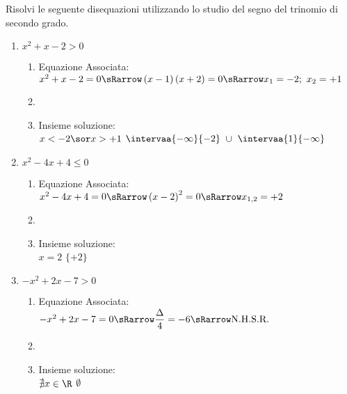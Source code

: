 \begin{esempio}
Risolvi le seguente disequazioni utilizzando lo studio del segno del trinomio 
di secondo grado.

\begin{enumerate}
\item \(x^2+x-2>0\)

\begin{enumerate}
 \item
  Equazione Associata:~~\(x^2+x-2=0 \sRarrow 
\left(x-1 \right)\left(x+2\right)=0 \sRarrow 
x_1=-2;~x_2=+1\)
 \item 
                   {}
 \item 
Insieme soluzione: \\
                  {\(x<-2 \sor x>+1\)}
                  {\(\intervaa{-\infty}{-2}~\cup~\intervaa{1}{-\infty}\)}
\end{enumerate}

\item \(x^2-4x+4\leqslant0\)

\begin{enumerate}
 \item
  Equazione Associata:~\(x^2-4x+4=0 \sRarrow 
                        \left(x-2 \right)^2=0 \sRarrow 
                        x_{1,2}=+2\)
 \item 
                   {}
 \item 
Insieme soluzione: \\
                  {\(x=2\)}
                  {\(\lbrace +2 \rbrace\)}
\end{enumerate}

\item \(-x^2+2x-7>0\)

\begin{enumerate}
 \item
  Equazione Associata:~\(-x^2+2x-7=0 \sRarrow 
                        \dfrac{\Delta}{4} = -6 \sRarrow 
                        \text{N.H.S.R.}\)
 \item 
                   {\parabolaamidmi}
 \item 
Insieme soluzione: \\
                  {\(\nexists x \in \R\)}
                  {\(\emptyset\)}
\end{enumerate}


\end{enumerate}
\end{esempio}
